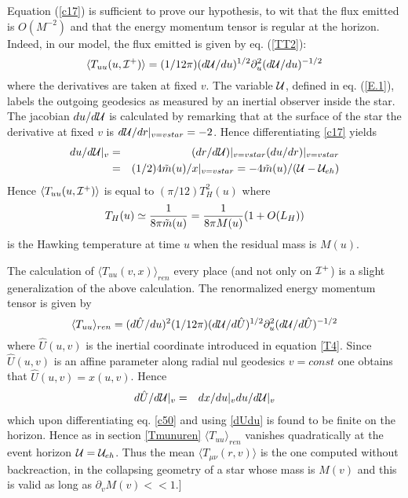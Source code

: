 \documentclass[12pt,oneside]{report}
\begin{document}
Equation (\ref{c17}) is sufficient to prove  our hypothesis, to
wit that the flux emitted is $O(M^{-2})$ and that the energy momentum tensor is
regular at the horizon. Indeed, in our model,
 the flux emitted is given by eq. (\ref{TT2}):  
\begin{equation}
\langle T_{uu} (u,{\cal I}^+)\rangle=
(1/12 \pi) (d{\cal U}/du)^{1/2}\partial_u^2(d{\cal U}/du)^{-1/2}
\label{c50}
\end{equation}
  where the derivatives are taken at fixed $v$. The variable ${\cal U}$, defined
in eq. (\ref{E.1}), labels the outgoing geodesics as measured by an inertial
observer inside the star. The  jacobian $du/d{\cal U}$
is calculated by remarking that at the surface of the star the derivative at
fixed $v$ is 
$d{\cal U}/dr\vert_{v=vstar} = -2$. Hence  differentiating \ref{c17} yields
\begin{eqnarray}
du/d{\cal
U}\vert_v &=&(dr/d{\cal U})\vert_{v=vstar}( du/ dr)\vert_{v=vstar}\nonumber\\
&=& (1/2)4 \tilde m(u) /
x\vert_{v=vstar}= -4 \tilde m(u) / ({\cal U}-{\cal U}_{eh})
\label{dUdu}
\end{eqnarray}
Hence $\langle T_{uu} (u,{\cal I}^+)\rangle$ is equal to $(\pi /
12) T_H^2(u)$ where \begin{equation}
T_H(u) \simeq {1 \over 8 \pi \tilde m(u) }= {1\over 8 \pi M(u)} (1 +
O(L_H))
\end{equation}
is the Hawking temperature at time $u$ when the residual mass
is $M(u)$. 

The calculation of $\langle T_{uu}(v,x)\rangle_{ren}$ every place
(and not only on ${\cal I}^+$) is a slight generalization of the above
calculation. The renormalized energy momentum
tensor is given by 
\begin{equation}
\langle T_{uu} \rangle_{ren} =(d \hat U/ du)^2
(1/12 \pi) (d{\cal U}/d\hat U)^{1/2}\partial_u^2(d{\cal U}/d\hat U)^{-1/2}
\end{equation}
where  $\hat U(u, v)$ is the inertial coordinate introduced in equation
\ref{T4}. Since  $\hat U(u, v)$ is an affine parameter along
radial nul geodesics $v=const$ one obtains that $\hat U(u, v) = x(u,v)$. Hence
\begin{eqnarray}
d \hat U / d{\cal U}\vert_v &=&
d x / d{u}\vert_v d u / d{\cal U}\vert_v
\end{eqnarray}
which upon differentiating eq. \ref{c50} and using \ref{dUdu} is found to be
finite on the horizon. Hence as in section \ref{Tmunuren}  $\langle T_{uu}
\rangle_{ren}$ vanishes quadratically at the event horizon
${\cal U}={\cal U}_{eh}$. Thus the mean
$\langle T_{\mu \nu} (r,v)\rangle$ is the one computed without backreaction, in
the collapsing geometry of a star whose mass is $M(v)$ and this is valid
as long as $\partial_v M(v)  << 1 $.]
\end{document}
